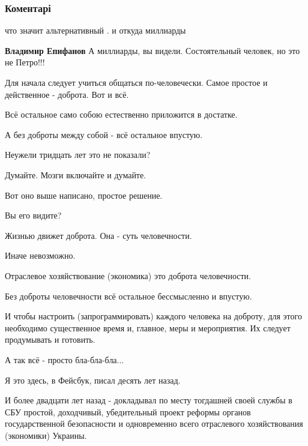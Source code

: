  
 
 
 
 
\subsubsection{Коментарі}

\begin{itemize} %
что значит альтернативный . и откуда миллиарды

\textbf{Владимир Епифанов} А миллиарды, вы видели. Состоятельный человек, но это не Петро!!!


Для начала следует учиться общаться по-человечески. Самое простое и действенное
- доброта. Вот и всё.

Всё остальное само собою естественно приложится в достатке.

А без доброты между собой - всё остальное впустую.

Неужели тридцать лет это не показали?

Думайте. Мозги включайте и думайте.

Вот оно выше написано, простое решение.

Вы его видите?

Жизнью движет доброта. Она - суть человечности.

Иначе невозможно.

Отраслевое хозяйствование (экономика) это доброта человечности.

Без доброты человечности всё остальное бессмысленно и впустую.

И чтобы настроить (запрограммировать) каждого человека на доброту, для этого
необходимо существенное время и, главное, меры и мероприятия. Их следует
продумывать и готовить.

А так всё - просто бла-бла-бла...

Я это здесь, в Фейсбук, писал десять лет назад.

И более двадцати лет назад - докладывал по месту тогдашней своей службы в СБУ
простой, доходчивый, убедительный проект реформы органов государственной
безопасности и одновременно всего отраслевого хозяйствования (экономики)
Украины.


\end{itemize}
